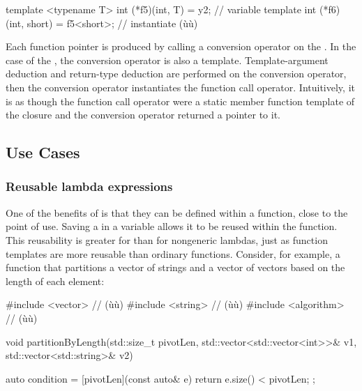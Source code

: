 {\begin{emcppslisting}[emcppsbatch=e3]
template <typename T> int (*f5)(int, T) = y2;  // variable template
int (*f6)(int, short) = f5<short>;             // instantiate (ù{}ù)
\end{emcppslisting}
    

\noindent Each function pointer is produced by calling a conversion operator on
the . In the case of the ,
the conversion operator is also a template. Template-argument deduction
and return-type deduction are performed on the conversion operator, then
the conversion operator instantiates the function call operator.
Intuitively, it is as though the function call operator were a static
member function template of the closure and the conversion operator
returned a pointer to it.

\subsection[Use Cases]{Use Cases}\label{use-cases}

\subsubsection[Reusable lambda expressions]{Reusable lambda expressions}\label{reusable-lambda-expressions}

One of the benefits of  is that they can be
defined within a function, close to the point of use. Saving a
 in a variable allows it to be reused within
the function. This reusability is greater for 
than for nongeneric lambdas, just as function templates are more
reusable than ordinary functions. Consider, for example, a function that
partitions a vector of strings and a vector of vectors based on the
length of each element:

\begin{emcppslisting}[emcppsstandards={c++14}]
#include <vector>     // (ù{}ù)
#include <string>     // (ù{}ù)
#include <algorithm>  // (ù{}ù)

void partitionByLength(std::size_t                    pivotLen,
                       std::vector<std::vector<int>>& v1,
                       std::vector<std::string>&      v2)
{
    auto condition = [pivotLen](const auto& e) { return e.size() < pivotLen; };

}
\end{emcppslisting}}
